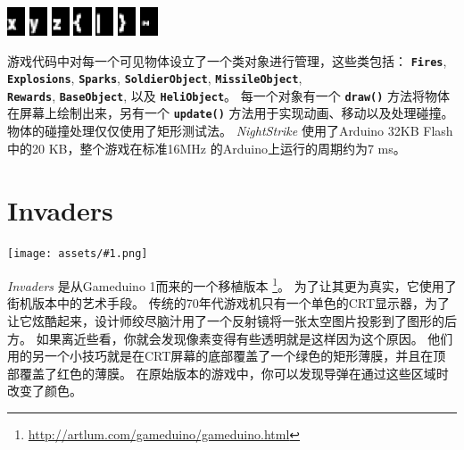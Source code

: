 \documentclass[10pt]{book}
\newcommand{\png}[1]{
\begin{center}
\texttt{[image: assets/\#1.png]}
\end{center}
}
\newcommand{\mach}[1]{\texttt{\textbf{#1}}}
\begin{document}
\begin{CJK}{UTF8}{gkai}
\begin{center}
\includegraphics[width=0.04\textwidth]{previews/nightstrike_2-INFOFONT-88.png}
\includegraphics[width=0.04\textwidth]{previews/nightstrike_2-INFOFONT-89.png}
\includegraphics[width=0.04\textwidth]{previews/nightstrike_2-INFOFONT-90.png}
\includegraphics[width=0.04\textwidth]{previews/nightstrike_2-INFOFONT-91.png}
\includegraphics[width=0.04\textwidth]{previews/nightstrike_2-INFOFONT-92.png}
\includegraphics[width=0.04\textwidth]{previews/nightstrike_2-INFOFONT-93.png}
\includegraphics[width=0.04\textwidth]{previews/nightstrike_2-INFOFONT-94.png}
\end{center}

游戏代码中对每一个可见物体设立了一个类对象进行管理，这些类包括：
\mach{Fires},
\mach{Explosions},
\mach{Sparks},
\mach{SoldierObject},
\mach{MissileObject}, \\
\mach{Rewards},
\mach{BaseObject}, 以及
\mach{HeliObject}。
每一个对象有一个 \mach{draw()} 方法将物体在屏幕上绘制出来，另有一个 \mach{update()} 方法用于实现动画、移动以及处理碰撞。
物体的碰撞处理仅仅使用了矩形测试法。
\textit{NightStrike} 使用了Arduino 32KB Flash中的20 KB，整个游戏在标准16MHz
的Arduino上运行的周期约为7 ms。

\newpage
\section{Invaders}

\png{invaders}

\textit{Invaders} 是从Gameduino 1而来的一个移植版本 \footnote{
\url{http://artlum.com/gameduino/gameduino.html}}。
为了让其更为真实，它使用了街机版本中的艺术手段。
传统的70年代游戏机只有一个单色的CRT显示器，为了让它炫酷起来，设计师绞尽脑汁用了一个反射镜将一张太空图片投影到了图形的后方。
如果离近些看，你就会发现像素变得有些透明就是这样因为这个原因。
他们用的另一个小技巧就是在CRT屏幕的底部覆盖了一个绿色的矩形薄膜，并且在顶部覆盖了红色的薄膜。
在原始版本的游戏中，你可以发现导弹在通过这些区域时改变了颜色。


\end{CJK}
\end{document}
